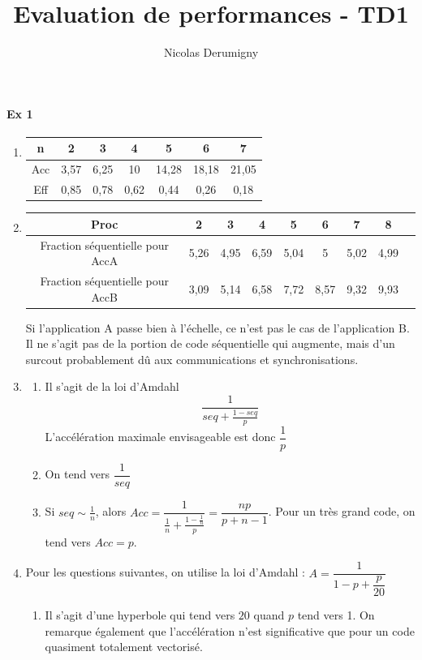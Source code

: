\documentclass{article}
\title{Evaluation de performances - TD1}
\author{Nicolas Derumigny}
\date{}
\begin{document}
\maketitle
\paragraph{Ex 1}
\begin{enumerate}
\item
\begin{tabular}{c|c|c|c|c|c|c}
n&2&3&4&5&6&7\\
\hline
Acc & 3,57&6,25&10&14,28&18,18&21,05\\
\hline
Eff & 0,85 & 0,78 & 0,62 & 0,44 & 0,26 & 0,18
\end{tabular}

\item

\begin{tabular}{c|c|c|c|c|c|c|c|c}
Proc & 2 &3 &4&5&6&7&8\\
\hline
Fraction séquentielle pour AccA&5,26&4,95&6,59&5,04&5&5,02&4,99\\
\hline
Fraction séquentielle pour AccB& 3,09&5,14&6,58&7,72&8,57&9,32&9,93\\
\end{tabular}
Si l'application A passe bien à l'échelle, ce n'est pas le cas de l'application B. Il ne s'agit pas de la portion de code séquentielle qui augmente, mais d'un surcout probablement dû aux communications et synchronisations.

\item \begin{enumerate}
\item Il s'agit de la loi d'Amdahl 
\[\dfrac{1}{seq + \frac{1-seq}{p}}\]
L'accélération maximale envisageable est donc $\dfrac{1}{p}$
\item On tend vers $\dfrac{1}{seq}$
\item Si $seq \sim \frac{1}{n}$, alors $Acc =\dfrac{1}{\frac{1}{n} + \frac{1-\frac{1}{n}}{p}} = \dfrac{np}{p+n-1}$. Pour un très grand code, on tend vers $Acc = p$.
\end{enumerate}


\item
Pour les questions suivantes, on utilise la loi d'Amdahl : $A=\dfrac{1}{1-p+\dfrac{p}{20}}$

\begin{enumerate}


\item Il s'agit d'une hyperbole qui tend vers $20$ quand $p$ tend vers 1. On remarque également que l'accélération n'est significative que pour un code quasiment totalement vectorisé.



\end{enumerate}
\end{enumerate}
\end{document}
